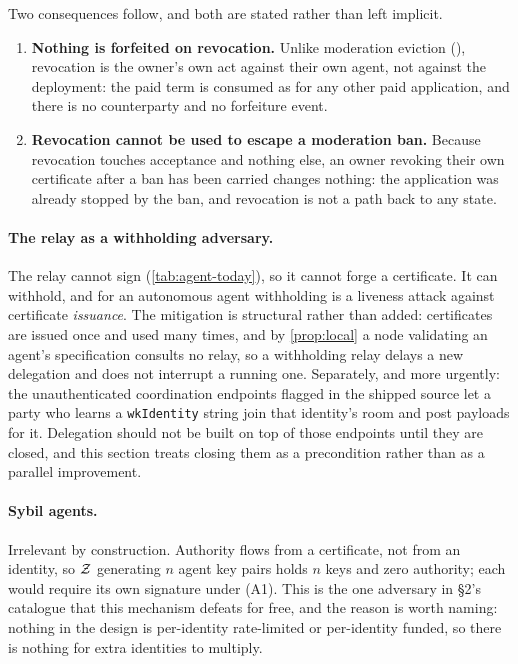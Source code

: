 \begin{remark}
Two consequences follow, and both are stated rather than left implicit.
\begin{enumerate}
  \item \textbf{Nothing is forfeited on revocation.} Unlike moderation eviction
  (), revocation is the owner's own act against their own agent, not against the
  deployment: the paid term is consumed as for any other paid application, and there is no
  counterparty and no forfeiture event.
  \item \textbf{Revocation cannot be used to escape a moderation ban.} Because revocation touches
  acceptance and nothing else, an owner revoking their own certificate after a ban has been carried
  changes nothing: the application was already stopped by the ban, and revocation is not a path back
  to any state.
\end{enumerate}
\end{remark}

\paragraph{The relay as a withholding adversary.} The relay cannot sign (\cref{tab:agent-today}), so
it cannot forge a certificate. It can withhold, and for an autonomous agent withholding is a liveness
attack against certificate \emph{issuance}. The mitigation is structural rather than added:
certificates are issued once and used many times, and by \cref{prop:local} a node validating an
agent's specification consults no relay, so a withholding relay delays a new delegation and does not
interrupt a running one. Separately, and more urgently: the unauthenticated coordination endpoints
flagged in the shipped source  let a party who learns a
\texttt{wkIdentity} string join that identity's room and post payloads for it. Delegation should not
be built on top of those endpoints until they are closed, and this section treats closing them as a
precondition rather than as a parallel improvement.

\paragraph{Sybil agents.} Irrelevant by construction. Authority flows from a certificate, not from an
identity, so $\mathcal{Z}$ generating $n$ agent key pairs holds $n$ keys and zero authority; each would
require its own signature under (A1). This is the one adversary in \S2's catalogue that this
mechanism defeats for free, and the reason is worth naming: nothing in the design is per-identity
rate-limited or per-identity funded, so there is nothing for extra identities to multiply.

